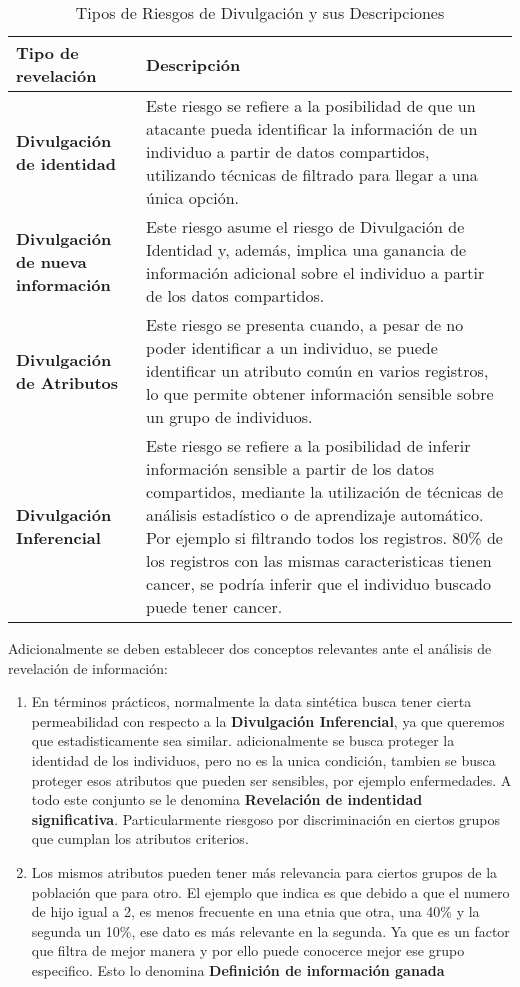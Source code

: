 \begin{table}[H]
	\centering
	\caption{Tipos de Riesgos de Divulgación y sus Descripciones}
	\label{relevantes-definiciones}
    \begin{tabular}{|m{15em}|m{25em}|}
    \hline
    \rowcolor[gray]{0.8}
    Tipo de revelación & Descripción \\
    \hline
    \textbf{Divulgación de identidad} 
    & Este riesgo se refiere a la posibilidad de que un atacante pueda identificar la información de un individuo a partir de datos compartidos, utilizando técnicas de filtrado para llegar a una única opción.\\
    \hline
    \textbf{Divulgación de nueva información} 
    & Este riesgo asume el riesgo de Divulgación de Identidad y, además, implica una ganancia de información adicional sobre el individuo a partir de los datos compartidos.\\
    \hline
    \textbf{Divulgación de Atributos} 
    & Este riesgo se presenta cuando, a pesar de no poder identificar a un individuo, se puede identificar un atributo común en varios registros, lo que permite obtener información sensible sobre un grupo de individuos.\\
    \hline
    \textbf{Divulgación Inferencial} 
    & Este riesgo se refiere a la posibilidad de inferir información sensible a partir de los datos compartidos, mediante la utilización de técnicas de análisis estadístico o de aprendizaje automático. Por ejemplo si filtrando todos los registros. 80\% de los registros con las mismas caracteristicas tienen cancer, se podría inferir que el individuo buscado puede tener cancer.\\
    \hline
    \end{tabular}
\end{table}

Adicionalmente se deben establecer dos conceptos relevantes ante el análisis de revelación de información:
\begin{enumerate}
    \item En términos prácticos, normalmente la data sintética busca tener cierta permeabilidad con respecto a la \textbf{Divulgación Inferencial}, ya que queremos que estadisticamente sea similar. adicionalmente se busca proteger la identidad de los individuos, pero no es la unica condición, tambien se busca proteger esos atributos que pueden ser sensibles, por ejemplo enfermedades. A todo este conjunto se le denomina \textbf{Revelación de indentidad significativa}. Particularmente riesgoso por discriminación en ciertos grupos que cumplan los atributos criterios.
    \item Los mismos atributos pueden tener más relevancia para ciertos grupos de la población que para otro. El ejemplo que indica \cite{el_emam_practical_2020} es que debido a que el numero de hijo igual a 2, es menos frecuente en una etnia que otra, una 40\% y la segunda un 10\%, ese dato es más relevante en la segunda. Ya que es un factor que filtra de mejor manera y por ello puede conocerce mejor ese grupo especifico. Esto lo denomina \textbf{Definición de información ganada}
\end{enumerate}
\newpage
